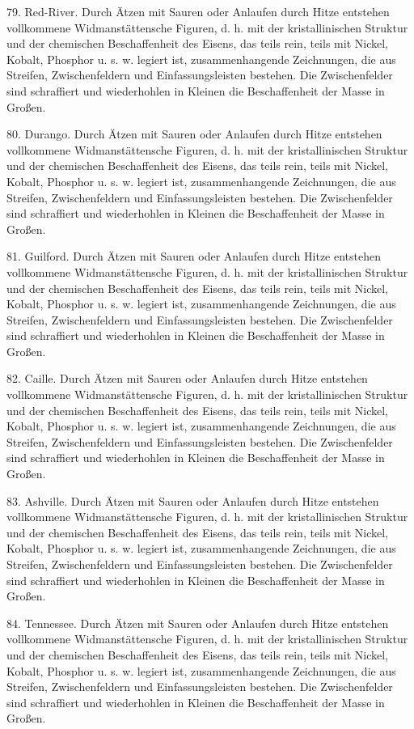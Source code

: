 \documentclass[a4paper, 11pt, oneside, polutonikogreek, german]{article}
\begin{document}
79. Red-River. Durch Ätzen mit Sauren oder Anlaufen durch Hitze entstehen vollkommene Widmanstättensche Figuren, d. h. mit der kristallinischen Struktur und der chemischen Beschaffenheit des Eisens, das teils rein, teils mit Nickel, Kobalt, Phosphor u. s. w. legiert ist, zusammenhangende Zeichnungen, die aus Streifen, Zwischenfeldern und Einfassungsleisten bestehen. Die Zwischenfelder sind schraffiert und wiederhohlen in Kleinen die Beschaffenheit der Masse in Großen.

80. Durango. Durch Ätzen mit Sauren oder Anlaufen durch Hitze entstehen vollkommene Widmanstättensche Figuren, d. h. mit der kristallinischen Struktur und der chemischen Beschaffenheit des Eisens, das teils rein, teils mit Nickel, Kobalt, Phosphor u. s. w. legiert ist, zusammenhangende Zeichnungen, die aus Streifen, Zwischenfeldern und Einfassungsleisten bestehen. Die Zwischenfelder sind schraffiert und wiederhohlen in Kleinen die Beschaffenheit der Masse in Großen.

81. Guilford. Durch Ätzen mit Sauren oder Anlaufen durch Hitze entstehen vollkommene Widmanstättensche Figuren, d. h. mit der kristallinischen Struktur und der chemischen Beschaffenheit des Eisens, das teils rein, teils mit Nickel, Kobalt, Phosphor u. s. w. legiert ist, zusammenhangende Zeichnungen, die aus Streifen, Zwischenfeldern und Einfassungsleisten bestehen. Die Zwischenfelder sind schraffiert und wiederhohlen in Kleinen die Beschaffenheit der Masse in Großen.

82. Caille. Durch Ätzen mit Sauren oder Anlaufen durch Hitze entstehen vollkommene Widmanstättensche Figuren, d. h. mit der kristallinischen Struktur und der chemischen Beschaffenheit des Eisens, das teils rein, teils mit Nickel, Kobalt, Phosphor u. s. w. legiert ist, zusammenhangende Zeichnungen, die aus Streifen, Zwischenfeldern und Einfassungsleisten bestehen. Die Zwischenfelder sind schraffiert und wiederhohlen in Kleinen die Beschaffenheit der Masse in Großen.

83. Ashville. Durch Ätzen mit Sauren oder Anlaufen durch Hitze entstehen vollkommene Widmanstättensche Figuren, d. h. mit der kristallinischen Struktur und der chemischen Beschaffenheit des Eisens, das teils rein, teils mit Nickel, Kobalt, Phosphor u. s. w. legiert ist, zusammenhangende Zeichnungen, die aus Streifen, Zwischenfeldern und Einfassungsleisten bestehen. Die Zwischenfelder sind schraffiert und wiederhohlen in Kleinen die Beschaffenheit der Masse in Großen.

84. Tennessee. Durch Ätzen mit Sauren oder Anlaufen durch Hitze entstehen vollkommene Widmanstättensche Figuren, d. h. mit der kristallinischen Struktur und der chemischen Beschaffenheit des Eisens, das teils rein, teils mit Nickel, Kobalt, Phosphor u. s. w. legiert ist, zusammenhangende Zeichnungen, die aus Streifen, Zwischenfeldern und Einfassungsleisten bestehen. Die Zwischenfelder sind schraffiert und wiederhohlen in Kleinen die Beschaffenheit der Masse in Großen.
\end{document}
